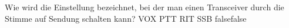     {Wie wird die Einstellung bezeichnet, bei der man einen Transceiver durch die Stimme auf Sendung schalten kann?}
    {VOX}
    {PTT}
    {RIT}
    {SSB}
    {false}{false}